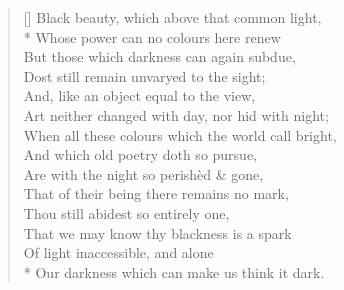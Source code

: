 \documentclass[MAIN]{subfiles}
\begin{document}
\settowidth{\versewidth}{Black beauty, which above that common light,}
\begin{verse}[\versewidth]
Black beauty, which above that common light,\\*
\vin Whose power can no colours here renew\\
\vin But those which darkness can again subdue,\\
Dost still remain unvaryed to the sight;\\
\vin And, like an object equal to the view,\\
Art neither changed with day, nor hid with night;\\
When all these colours which the world call bright,\\
\vin And which old poetry doth so pursue,\\
Are with the night so perish\`ed \& gone,\\
\vin That of their being there remains no mark,\\
Thou still abidest so entirely one,\\
\vin That we may know thy blackness is a spark\\
Of light inaccessible, and alone\\*
\vin Our darkness which can make us think it dark.
\end{verse}
\end{document}
